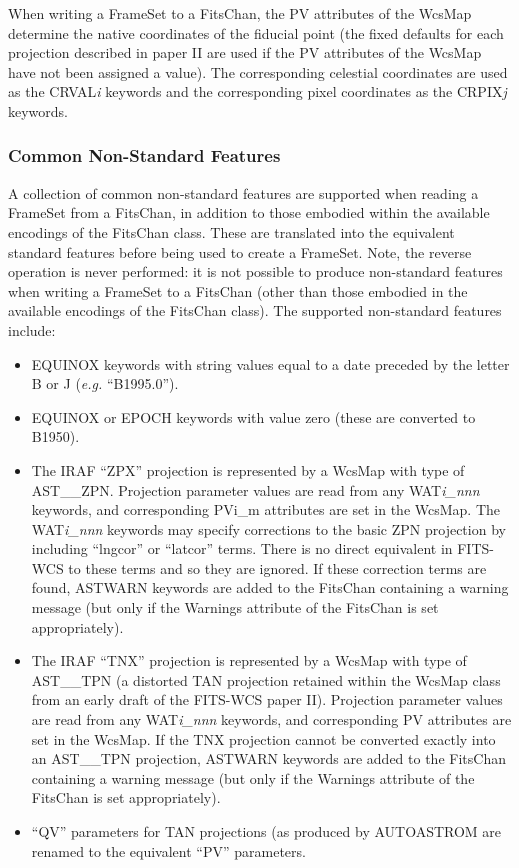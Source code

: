 \documentclass[twoside,11pt]{article}
\newcommand{\htmladdnormallink}[2]{#1}
\begin{document}
When writing a FrameSet to a FitsChan, the PV attributes of the WcsMap
determine the native coordinates of the fiducial point (the fixed
defaults for each projection described in paper II are used if the PV
attributes of the WcsMap have not been assigned a value). The
corresponding celestial coordinates are used as the CRVAL\emph{i}
keywords and the corresponding pixel coordinates as the CRPIX\emph{j}
keywords.

\subsubsection{Common Non-Standard Features}
A collection of common non-standard features are supported when reading a
FrameSet from a FitsChan, in addition 
to those embodied within the
available encodings of the FitsChan class. These are translated into the
equivalent standard features before being used to create a FrameSet.
Note, the reverse operation is never performed: it is not possible to
produce non-standard features when writing a FrameSet to a FitsChan
(other than those embodied in the available encodings of the FitsChan
class). The supported non-standard features include:

\begin{itemize}
\item EQUINOX keywords with string values equal to a date preceded
by the letter B or J (\emph{e.g.} ``B1995.0''). 

\item EQUINOX or EPOCH keywords with value zero  (these are converted to 
B1950). 

\item The IRAF ``ZPX'' projection is represented by a
WcsMap with type of
AST\_\_ZPN. Projection parameter values are read from any WAT\emph{i\_nnn}
keywords, and corresponding PVi\_m attributes are set in the 
WcsMap. The WAT\emph{i\_nnn} keywords may specify corrections to the basic 
ZPN projection by including ``lngcor'' or ``latcor'' terms. There is no 
direct equivalent in FITS-WCS to these terms and so they are ignored. If 
these correction terms are found, ASTWARN keywords are added to the FitsChan 
containing a warning message (but only if the Warnings
attribute of the FitsChan is set appropriately). 

\item The IRAF ``TNX'' projection is represented by a WcsMap with type of
AST\_\_TPN (a distorted TAN projection retained within the WcsMap class
from an early draft of the FITS-WCS paper II). Projection parameter values
are read from any WAT\emph{i\_nnn} keywords, and corresponding PV
attributes are set in the WcsMap. If the TNX projection cannot be
converted exactly into an AST\_\_TPN projection, ASTWARN keywords are
added to the FitsChan containing a warning message (but only if the
Warnings attribute of the FitsChan is set appropriately).

\item ``QV'' parameters for TAN projections (as produced by 
\htmladdnormallink{AUTOASTROM}{http://www.astro.gla.ac.uk/users/norman/star/autoastrom/} 
are renamed to the equivalent ``PV'' parameters.

\end{itemize}
\end{document}
